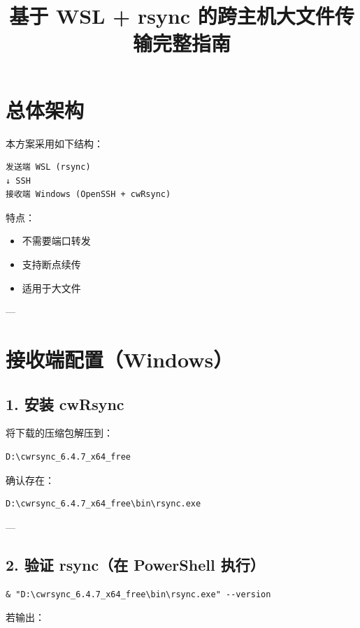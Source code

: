 \documentclass[UTF8]{ctexart}
\title{基于 WSL + rsync 的跨主机大文件传输完整指南}
\author{}
\date{}
\begin{document}
\maketitle

\section{总体架构}

本方案采用如下结构：

\begin{lstlisting}
发送端 WSL (rsync)
↓ SSH
接收端 Windows (OpenSSH + cwRsync)
\end{lstlisting}

特点：
\begin{itemize}
\item 不需要端口转发
\item 支持断点续传
\item 适用于大文件
\end{itemize}

---

\section{接收端配置（Windows）}

\subsection{1. 安装 cwRsync}

将下载的压缩包解压到：

\begin{lstlisting}
D:\cwrsync_6.4.7_x64_free
\end{lstlisting}

确认存在：

\begin{lstlisting}
D:\cwrsync_6.4.7_x64_free\bin\rsync.exe
\end{lstlisting}

---

\subsection{2. 验证 rsync（在 PowerShell 执行）}

\begin{lstlisting}
& "D:\cwrsync_6.4.7_x64_free\bin\rsync.exe" --version
\end{lstlisting}

若输出：
\end{document}
